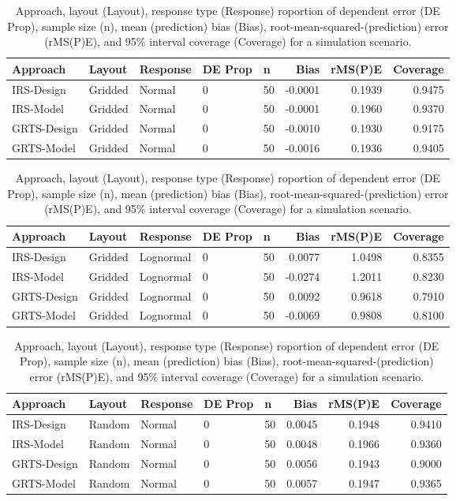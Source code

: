 \documentclass[]{elsarticle} %
\begin{document}
\begin{table}[ht]
\centering
\begin{tabular}{lllllrrr}
  \hline
Approach & Layout & Response & DE Prop & n & Bias & rMS(P)E & Coverage \\ 
  \hline
IRS-Design & Gridded & Normal & 0 & 50 & -0.0001 & 0.1939 & 0.9475 \\ 
  IRS-Model & Gridded & Normal & 0 & 50 & -0.0001 & 0.1960 & 0.9370 \\ 
  GRTS-Design & Gridded & Normal & 0 & 50 & -0.0010 & 0.1930 & 0.9175 \\ 
  GRTS-Model & Gridded & Normal & 0 & 50 & -0.0016 & 0.1936 & 0.9405 \\ 
   \hline
\end{tabular}
\caption{Approach, layout (Layout), response type (Response) roportion of dependent error (DE Prop), sample size (n), mean (prediction) bias (Bias), root-mean-squared-(prediction) error (rMS(P)E), and 95\% interval coverage (Coverage) for a simulation scenario.} 
\end{table}
\begin{table}[ht]
\centering
\begin{tabular}{lllllrrr}
  \hline
Approach & Layout & Response & DE Prop & n & Bias & rMS(P)E & Coverage \\ 
  \hline
IRS-Design & Gridded & Lognormal & 0 & 50 & 0.0077 & 1.0498 & 0.8355 \\ 
  IRS-Model & Gridded & Lognormal & 0 & 50 & -0.0274 & 1.2011 & 0.8230 \\ 
  GRTS-Design & Gridded & Lognormal & 0 & 50 & 0.0092 & 0.9618 & 0.7910 \\ 
  GRTS-Model & Gridded & Lognormal & 0 & 50 & -0.0069 & 0.9808 & 0.8100 \\ 
   \hline
\end{tabular}
\caption{Approach, layout (Layout), response type (Response) roportion of dependent error (DE Prop), sample size (n), mean (prediction) bias (Bias), root-mean-squared-(prediction) error (rMS(P)E), and 95\% interval coverage (Coverage) for a simulation scenario.} 
\end{table}
\begin{table}[ht]
\centering
\begin{tabular}{lllllrrr}
  \hline
Approach & Layout & Response & DE Prop & n & Bias & rMS(P)E & Coverage \\ 
  \hline
IRS-Design & Random & Normal & 0 & 50 & 0.0045 & 0.1948 & 0.9410 \\ 
  IRS-Model & Random & Normal & 0 & 50 & 0.0048 & 0.1966 & 0.9360 \\ 
  GRTS-Design & Random & Normal & 0 & 50 & 0.0056 & 0.1943 & 0.9000 \\ 
  GRTS-Model & Random & Normal & 0 & 50 & 0.0057 & 0.1947 & 0.9365 \\ 
   \hline
\end{tabular}
\caption{Approach, layout (Layout), response type (Response) roportion of dependent error (DE Prop), sample size (n), mean (prediction) bias (Bias), root-mean-squared-(prediction) error (rMS(P)E), and 95\% interval coverage (Coverage) for a simulation scenario.} 
\end{table}
\end{document}
